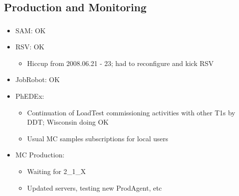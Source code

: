 \documentclass{beamer}
\begin{document}
\subsection{Production and Monitoring}
\begin{frame}
\frametitle{}
\begin{itemize}
    \item SAM: OK
    \item RSV: OK
    \begin{itemize}
        \item Hiccup from 2008.06.21 - 23; had to reconfigure and kick RSV
    \end{itemize}
    \item JobRobot: OK 
    \item PhEDEx:
    \begin{itemize}
        \item Continuation of LoadTest commissioning activities with other T1s by DDT; Wisconsin doing OK
        \item Usual MC samples subscriptions for local users
    \end{itemize}
    \item MC Production:
    \begin{itemize}
        \item Waiting for 2\_1\_X
        \item Updated servers, testing new ProdAgent, etc
    \end{itemize}
\end{itemize}
\end{frame}
\end{document}
